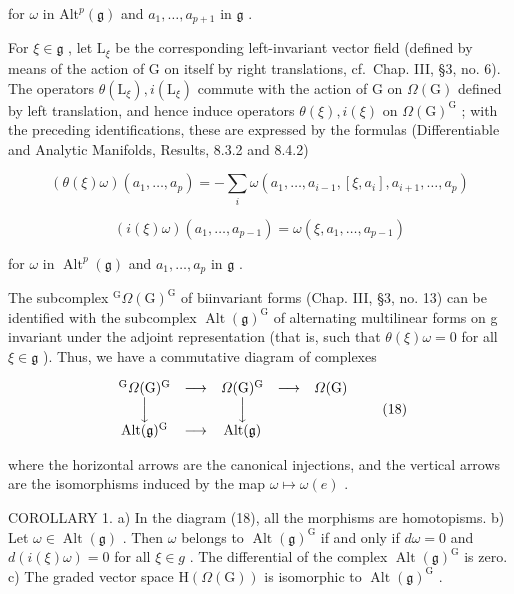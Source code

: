 for \(\omega\) in \(\mathrm{Alt}^p (\mathfrak{g})\) and \(a_1,\ldots ,a_{p + 1}\) in \(\mathfrak{g}\) .

For \(\xi \in \mathfrak{g}\) , let \(\mathrm{L}_{\xi}\) be the corresponding left-invariant vector field (defined by means of the action of G on itself by right translations, cf.~Chap. III, §3, no. 6). The operators \(\theta (\mathrm{L}_{\xi}), i(\mathrm{L}_{\xi})\) commute with the action of G on \(\Omega (\mathrm{G})\) defined by left translation, and hence induce operators \(\theta (\xi), i(\xi)\) on \(\Omega (\mathrm{G})^{\mathrm{G}}\) ; with the preceding identifications, these are expressed by the formulas (Differentiable and Analytic Manifolds, Results, 8.3.2 and 8.4.2)

\[
(\theta (\xi) \omega) (a _ {1}, \dots , a _ {p}) = - \sum_ {i} \omega (a _ {1}, \dots , a _ {i - 1}, [ \xi , a _ {i} ], a _ {i + 1}, \dots , a _ {p})
\]

\[
(i (\xi) \omega) (a _ {1}, \ldots , a _ {p - 1}) = \omega (\xi , a _ {1}, \ldots , a _ {p - 1})
\]

for \(\omega\) in \(\operatorname{Alt}^p (\mathfrak{g})\) and \(a_1,\ldots ,a_p\) in \(\mathfrak{g}\) .

The subcomplex \({}^{\mathrm{G}}\varOmega(\mathrm{G})^{\mathrm{G}}\) of biinvariant forms (Chap. III, §3, no. 13) can be identified with the subcomplex \(\operatorname{Alt}(\mathfrak{g})^{\mathrm{G}}\) of alternating multilinear forms on g invariant under the adjoint representation (that is, such that \(\theta(\xi)\omega=0\) for all \(\xi\in\mathfrak{g}\) ). Thus, we have a commutative diagram of complexes

\[
\begin{array}{c c c c c} ^ {\mathrm{G}} \varOmega (\mathrm{G}) ^ {\mathrm{G}} & \longrightarrow & \varOmega (\mathrm{G}) ^ {\mathrm{G}} & \longrightarrow & \varOmega (\mathrm{G}) \\ \Big \downarrow & & \Big \downarrow & & \\ \operatorname{Alt} (\mathfrak {g}) ^ {\mathrm{G}} & \longrightarrow & \operatorname{Alt} (\mathfrak {g}) & & \end{array}\tag{18}
\]

where the horizontal arrows are the canonical injections, and the vertical arrows are the isomorphisms induced by the map \(\omega\mapsto\omega(e)\) .

COROLLARY 1. a) In the diagram (18), all the morphisms are homotopisms. b) Let \(\omega \in \operatorname{Alt}(\mathfrak{g})\) . Then \(\omega\) belongs to \(\operatorname{Alt}(\mathfrak{g})^{\mathrm{G}}\) if and only if \(d\omega = 0\) and \(d(i(\xi)\omega) = 0\) for all \(\xi \in g\) . The differential of the complex \(\operatorname{Alt}(\mathfrak{g})^{\mathrm{G}}\) is zero. c) The graded vector space \(\mathrm{H}(\Omega(\mathrm{G}))\) is isomorphic to \(\operatorname{Alt}(\mathfrak{g})^{\mathrm{G}}\) .

